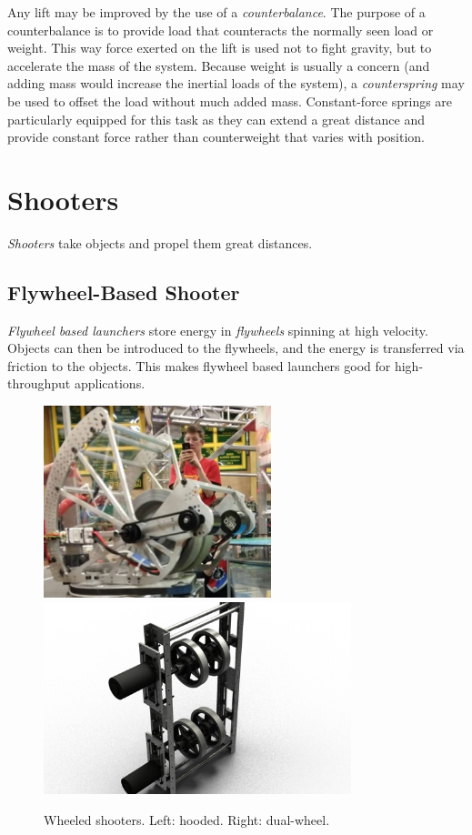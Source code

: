 Any lift may be improved by the use of a \textit{counterbalance}. The purpose of a counterbalance is to provide load that counteracts the normally seen load or weight. This way force exerted on the lift is used not to fight gravity, but to accelerate the mass of the system. Because weight is usually a concern (and adding mass would increase the inertial loads of the system), a \textit{counterspring} may be used to offset the load without much added mass. Constant-force springs are particularly equipped for this task as they can extend a great distance and provide constant force rather than counterweight that varies with position.

\section{Shooters}
\textit{Shooters} take objects and propel them great distances.
\subsection{Flywheel-Based Shooter}
\textit{Flywheel based launchers} store energy in \textit{flywheels} spinning at high velocity. Objects can then be introduced to the flywheels, and the energy is transferred via friction to the objects. This makes flywheel based launchers good for high-throughput applications.

\begin{figure}[H]
	\includegraphics[height=2.2in]{imgs/shooter_hooded.png}
	\includegraphics[height=2.2in]{imgs/shooter_dualwheel.jpeg}
	\caption{Wheeled shooters. Left: hooded. Right: dual-wheel.}
\end{figure}

